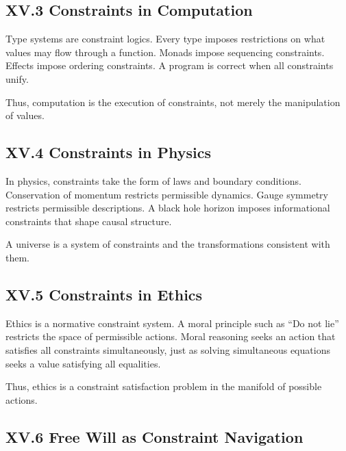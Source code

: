 \documentclass[12pt,letterpaper]{article}
\begin{document}
\subsection{XV.3 Constraints in Computation}

Type systems are constraint logics. Every type imposes restrictions on what values may flow through a function. Monads impose sequencing constraints. Effects impose ordering constraints. A program is correct when all constraints unify.

Thus, computation is the execution of constraints, not merely the manipulation of values.

\subsection{XV.4 Constraints in Physics}

In physics, constraints take the form of laws and boundary conditions. Conservation of momentum restricts permissible dynamics. Gauge symmetry restricts permissible descriptions. A black hole horizon imposes informational constraints that shape causal structure.

A universe is a system of constraints and the transformations consistent with them.

\subsection{XV.5 Constraints in Ethics}

Ethics is a normative constraint system. A moral principle such as ``Do not lie'' restricts the space of permissible actions. Moral reasoning seeks an action that satisfies all constraints simultaneously, just as solving simultaneous equations seeks a value satisfying all equalities.

Thus, ethics is a constraint satisfaction problem in the manifold of possible actions.

\subsection{XV.6 Free Will as Constraint Navigation}
\end{document}

